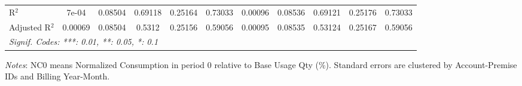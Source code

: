 \begin{table}[htbp]
\begin{adjustbox}{scale = 0.7}
\begin{tabular}{lcccccccccc}
R$^2$ & 7e-04&0.08504&0.69118&0.25164&0.73033&0.00096&0.08536&0.69121&0.25176&0.73033\\
Adjusted R$^2$ & 0.00069&0.08504&0.5312&0.25156&0.59056&0.00095&0.08535&0.53124&0.25167&0.59056\\
\bottomrule\bottomrule
\multicolumn{11}{l}{\emph{Signif. Codes: ***: 0.01, **: 0.05, *: 0.1}}\\
\end{tabular}
\end{adjustbox}
\begin{tablenotes}
\footnotesize
\emph{\medskip Notes}: NC0 means Normalized Consumption in period 0 relative to Base Usage Qty (\%). Standard errors are clustered by Account-Premise IDs and Billing Year-Month.
\end{tablenotes}
\end{table}